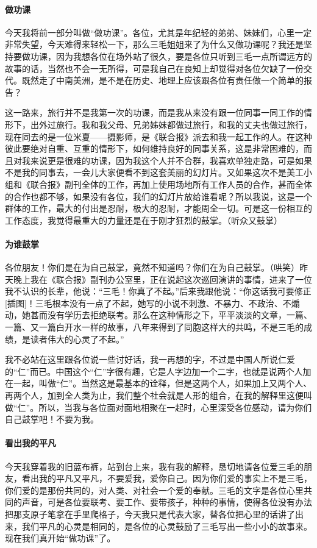 \paragraph*{做功课}
\par 今天我将前一部分叫做“做功课”。各位，尤其是年纪轻的弟弟、妹妹们，心里一定非常失望，今天难得来轻松一下，那么三毛姐姐来了为什么又做功课呢？我还是坚持要做功课，因为我想各位在场外站了很久，要是各位只听到三毛一点所谓远方的故事的话，当然也不会一无所得，可是我自己在良知上却觉得对各位欠缺了一份交代。既然走了中南美洲，是不是在历史、地理上应该跟各位有责任做一个简单的报告？
\par 这一路来，旅行并不是我第一次的功课，而是我从来没有跟一位同事一同工作的情形下，出外过旅行。我和我父母、兄弟姊妹都做过旅行，和我的丈夫也做过旅行，现在同去的是一位米夏——摄影师，是《联合报》派去和我一起工作的人。在这种彼此要绝对自重、互重的情形下，如何维持良好的同事关系，这是非常困难的，而且对我来说更是很难的功课，因为我这个人并不合群，我喜欢单独走路，可是如果不是我的同事去，一会儿大家便看不到这套美丽的幻灯片。又如果这次不是美工小组和《联合报》副刊全体的工作，再加上使用场地所有工作人员的合作，甚而全体的合作也都不够，如果没有各位，我们的幻灯片放给谁看呢？所以我说，这是一个群体的工作，最大的付出是忍耐，极大的忍耐，才能周全一切。可是这一份相互的工作态度，我觉得最重大的力量还是在于刚才狂烈的鼓掌。（听众又鼓掌）
\paragraph*{为谁鼓掌}
\par 各位朋友！你们是在为自己鼓掌，竟然不知道吗？你们在为自己鼓掌。（哄笑）昨天晚上我在《联合报》副刊办公室里，正在说起这次巡回演讲的事情，进来了一位我不认识的长辈，他说：“三毛！你真了不起。”后来我跟他说：“你这话我可要修正[插图]！三毛根本没有一点了不起，她写的小说不刺激、不暴力、不政治、不煽动，她甚而没有学历去拒绝联考。那么在这种情形之下，平平淡淡的文章，一篇、一篇、又一篇白开水一样的故事，八年来得到了同胞这样大的共鸣，不是三毛的成绩，是读者伟大的心灵了不起。”
\par 我不必站在这里跟各位说一些讨好话，我一再想的字，不过是中国人所说仁爱的“仁”而已。中国这个“仁”字很有趣，它是人字边加一个二字，也就是说两个人加在一起，叫做“仁”。当然这是最基本的诠释，但是这两个人，如果加上又两个人、再两个人，加到全人类为止，我们整个社会就是人形的组合，在我的解释里这便叫做“仁”。所以，当我与各位面对面地相聚在一起时，心里深受各位感动，请为你们自己鼓掌吧！不要为我。
\paragraph*{看出我的平凡}
\par 今天我穿着我的旧蓝布裤，站到台上来，我有我的解释，恳切地请各位爱三毛的朋友，看出我的平凡又平凡，不要爱我，爱你自己。因为你们爱的事实上不是三毛，你们爱的是那份共同的，对人类、对社会一个爱的奉献。三毛的文字是各位心里共同的声音，可是各位要联考、要工作、要带孩子，种种的事情，使得各位没有办法把那支原子笔拿在手里爬格子，今天我只是代表大家，替各位把心里的话讲了出来，我们平凡的心灵是相同的，是各位的心灵鼓励了三毛写出一些小小的故事来。现在我们真开始“做功课”了。
